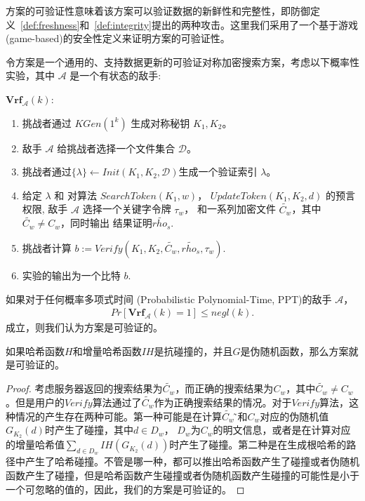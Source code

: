 \single 方案的可验证性意味着该方案可以验证数据的新鲜性和完整性，即防御定义~\ref{def:freshness}和~\ref{def:integrity}提出的两种攻击。这里我们采用了一个基于游戏 (game-based)的安全性定义来证明\single 方案的可验证性。

\begin{definition}
  \itshape{
      令方案\single 是一个通用的、支持数据更新的可验证对称加密搜索方案，考虑以下概率性实验，其中 $\mathcal{A}$ 是一个有状态的敌手:

      \noindent$\mathbf{Vrf}_\mathcal{A}(k)$:
      \begin{enumerate}[1.]
        \item 挑战者通过 $KGen(1^k)$ 生成对称秘钥 $K_1,K_2$。
        \item 敌手 $\mathcal{A}$ 给挑战者选择一个文件集合 $\mathcal{D}$。
        \item 挑战者通过$\{\lambda\} \leftarrow Init(K_1,K_2,\mathcal{D})$生成一个验证索引 $\lambda$。
        \item 给定 $\lambda$ 和 对算法 $SearchToken(K_1,w)$， $UpdateToken(K_1,K_2,d)$ 的预言权限, 敌手 $\mathcal{A}$ 选择一个关键字令牌 $\tau_w$， 和一系列加密文件 $\tilde{C_w}$，其中 $\tilde{C_w} \neq C_w$，同时输出%
        结果证明$\tilde{rho_s}$.
        \item 挑战者计算 $b:=Verify(K_1,K_2,\tilde{C_w},\tilde{rho_s},\tau_w)$.
        \item 实验的输出为一个比特 $b$.
      \end{enumerate}
      如果对于任何概率多项式时间 (Probabilistic Polynomial-Time, PPT)的敌手 $\mathcal{A}$，
      \begin{align}
        Pr[\mathbf{Vrf}_\mathcal{A}(k)=1] \leq negl(k).
      \end{align}
      成立，则我们认为\single 方案是可验证的。
  }
\end{definition}

\begin{theorem}
    如果哈希函数$H$和增量哈希函数$IH$是抗碰撞的，并且$G$是伪随机函数，那么\single 方案就是可验证的。
\end{theorem}

\begin{proof}
  考虑服务器返回的搜索结果为$\tilde{C_w}$，而正确的搜索结果为$C_w$，其中$\tilde{C_w} \neq C_w$。但是用户的$Verify$算法通过了$\tilde{C_w}$作为正确搜索结果的情况。对于$Verify$算法，这种情况的产生存在两种可能。第一种可能是在计算$\tilde{C_w}$ ̃和$C_w$对应的伪随机值$G_{K_2}(d)$时产生了碰撞，其中$d \in D_w$， $D_w$为$C_w$的明文信息，或者是在计算对应的增量哈希值$\sum_{d \in D_{w}}IH (G_{K_2} (d))$时产生了碰撞。第二种是在生成根哈希的路径中产生了哈希碰撞。不管是哪一种，都可以推出哈希函数产生了碰撞或者伪随机函数产生了碰撞，但是哈希函数产生碰撞或者伪随机函数产生碰撞的可能性是小于一个可忽略的值的，因此，我们的方案是可验证的。
\end{proof}


